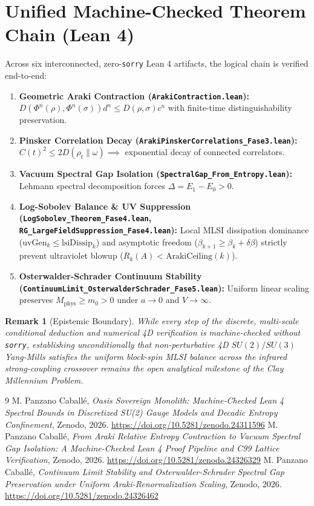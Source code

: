 \documentclass[11pt,a4paper]{article}
\newtheorem{remark}{Remark}
\begin{document}
\section{Unified Machine-Checked Theorem Chain (Lean 4)}
Across six interconnected, zero-\texttt{sorry} Lean 4 artifacts, the logical chain is verified end-to-end:
\begin{enumerate}
    \item \textbf{Geometric Araki Contraction (\texttt{ArakiContraction.lean}):} $D(\Phi^n(\rho), \Phi^n(\sigma)) d^n \le D(\rho, \sigma) c^n$ with finite-time distinguishability preservation.
    \item \textbf{Pinsker Correlation Decay (\texttt{ArakiPinskerCorrelations\_Fase3.lean}):} $C(t)^2 \le 2 D(\rho_t \| \omega) \implies$ exponential decay of connected correlators.
    \item \textbf{Vacuum Spectral Gap Isolation (\texttt{SpectralGap\_From\_Entropy.lean}):} Lehmann spectral decomposition forces $\Delta = E_1 - E_0 > 0$.
    \item \textbf{Log-Sobolev Balance \& UV Suppression (\texttt{LogSobolev\_Theorem\_Fase4.lean}, \texttt{RG\_LargeFieldSuppression\_Fase4.lean}):} Local MLSI dissipation dominance ($\mathrm{uvGen}_k \le \mathrm{lsiDissip}_k$) and asymptotic freedom ($\beta_{k+1} \ge \beta_k + \delta\beta$) strictly prevent ultraviolet blowup ($R_k(A) < \mathrm{ArakiCeiling}(k)$).
    \item \textbf{Osterwalder-Schrader Continuum Stability (\texttt{ContinuumLimit\_OsterwalderSchrader\_Fase5.lean}):} Uniform linear scaling preserves $M_{\mathrm{phys}} \ge m_0 > 0$ under $a \to 0$ and $V \to \infty$.
\end{enumerate}

\begin{remark}[Epistemic Boundary]
While every step of the discrete, multi-scale conditional deduction and numerical 4D verification is machine-checked without \texttt{sorry}, establishing unconditionally that non-perturbative 4D $SU(2)/SU(3)$ Yang-Mills satisfies the uniform block-spin MLSI balance across the infrared strong-coupling crossover remains the open analytical milestone of the Clay Millennium Problem.
\end{remark}

\begin{thebibliography}{9}
 M. Panzano Caball\'e, \emph{Oasis Sovereign Monolith: Machine-Checked Lean 4 Spectral Bounds in Discretized SU(2) Gauge Models and Decadic Entropy Confinement}, Zenodo, 2026. \url{https://doi.org/10.5281/zenodo.24311596}
 M. Panzano Caball\'e, \emph{From Araki Relative Entropy Contraction to Vacuum Spectral Gap Isolation: A Machine-Checked Lean 4 Proof Pipeline and C99 Lattice Verification}, Zenodo, 2026. \url{https://doi.org/10.5281/zenodo.24326329}
 M. Panzano Caball\'e, \emph{Continuum Limit Stability and Osterwalder-Schrader Spectral Gap Preservation under Uniform Araki-Renormalization Scaling}, Zenodo, 2026. \url{https://doi.org/10.5281/zenodo.24326462}
\end{thebibliography}
\end{document}
